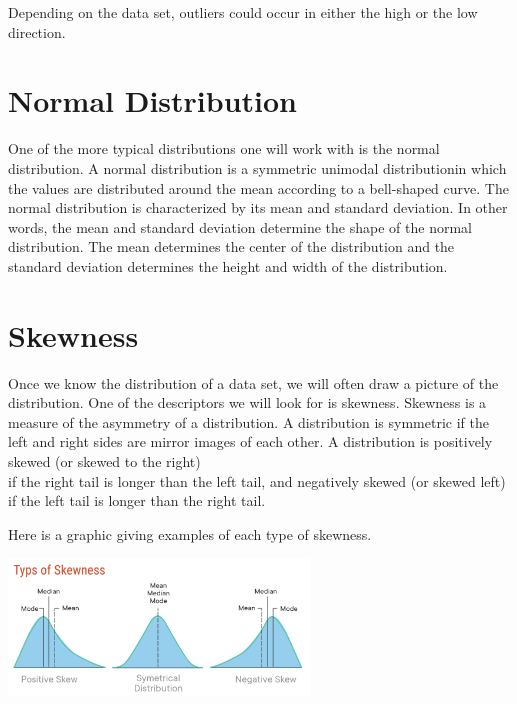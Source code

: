 \documentclass[
  letterpaper,
  DIV=11,
  numbers=noendperiod]{scrreprt}
\begin{document}
Depending on the data set, outliers could occur in either the high or
the low direction.

\section*{Normal Distribution}\label{normal-distribution}


One of the more typical distributions one will work with is the normal
distribution. A normal distribution is a symmetric unimodal
distributionin which the values are distributed around the mean
according to a bell-shaped curve. The normal distribution is
characterized by its mean and standard deviation. In other words, the
mean and standard deviation determine the shape of the normal
distribution. The mean determines the center of the distribution and the
standard deviation determines the height and width of the distribution.

\section*{Skewness}\label{skewness}


Once we know the distribution of a data set, we will often draw a
picture of the distribution. One of the descriptors we will look for is
skewness. Skewness is a measure of the asymmetry of a distribution. A
distribution is symmetric if the left and right sides are mirror images
of each other. A distribution is positively skewed (or skewed to the
right)\\
if the right tail is longer than the left tail, and negatively skewed
(or skewed left) if the left tail is longer than the right tail.

Here is a graphic giving examples of each type of skewness.

\includegraphics[width=0.6\textwidth,height=\textheight]{./images/SL_2.jpg}
\end{document}
